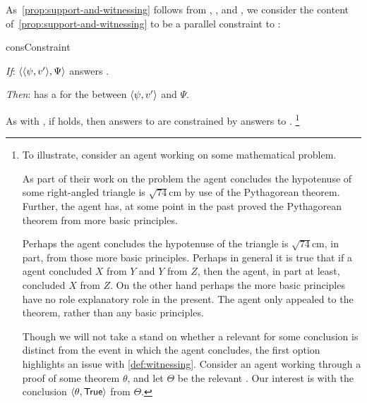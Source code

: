 \begin{note}
  As~\autoref{prop:support-and-witnessing} follows from \linkW{}, \linkH{}, and \issueInclusion{}, we consider the content of~\autoref{prop:support-and-witnessing} to be a parallel constraint to \issueInclusion{}:

  \begin{constraint}{consConstraint}{\issueConstraint{}}
    \vspace{-\baselineskip}
    \begin{itenum}
    \item[\emph{If}:]
      \(\langle \langle \psi, v' \rangle, \Psi \rangle\) answers \qWhyV{}.
    \item[\emph{Then}:]
      \vAgent{} has a \wit{} for the \ros{} between \(\langle \psi, v' \rangle\) and \(\Psi\).
    \end{itenum}
    \vspace{-\baselineskip}
  \end{constraint}

  As with \issueInclusion{}, if \issueConstraint{} holds, then answers to \qWhyV{} are constrained by answers to \qHowV{}.%
  \footnote{
    To illustrate, consider an agent working on some mathematical problem.

    As part of their work on the problem the agent concludes the hypotenuse of some right-angled triangle is \(\sqrt{74}\text{cm}\) by use of the Pythagorean theorem.
    Further, the agent has, at some point in the past proved the Pythagorean theorem from more basic principles.

    Perhaps the agent concludes the hypotenuse of the triangle is \(\sqrt{74}\text{cm}\), in part, from those more basic principles.
    Perhaps in general it is true that if a agent concluded \(X\) from \(Y\) and \(Y\) from \(Z\), then the agent, in part at least, concluded \(X\) from \(Z\).
    On the other hand perhaps the more basic principles have no role explanatory role in the present.
    The agent only appealed to the theorem, rather than any basic principles.

    Though we will not take a stand on whether a relevant  for some conclusion is distinct from the event in which the agent concludes, the first option highlights an issue with \autoref{def:witnessing}.
    Consider an agent working through a proof of some theorem \(\theta\), and let \(\Theta\) be the relevant \pool{}.
    Our interest is with the conclusion \(\pv{\theta}{\valI{True}}\) from \(\Theta\).

}
\end{note}
